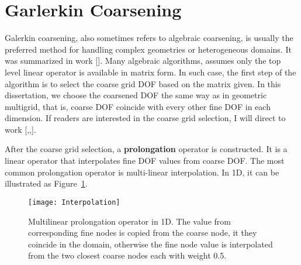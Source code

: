 \section{Garlerkin Coarsening}
Galerkin coarsening, also sometimes refers to algebraic coarsening, is usually the preferred method for handling complex geometries or heterogeneous domains. It was summarized in work [\cite{brandt1986algebraic}]. Many algebraic algorithms, assumes only the top level linear operator is available in matrix form. In such case, the first step of the algorithm is to select the coarse grid DOF based on the matrix given. In this dissertation, we choose the coarsened DOF the same way as in geometric multigrid, that is, coarse DOF coincide with every other fine DOF in each dimension. If readers are interested in the coarse grid selection, I will direct to work [\cite{vanvek1996algebraic},\cite{brandt1986algebraic},\cite{griebel2003algebraic}].

After the coarse grid selection, a \textbf{prolongation} operator is constructed. It is a linear operator that interpolates fine DOF values from coarse DOF. The most common prolongation operator is multi-linear interpolation. In 1D, it can be illustrated as Figure~\ref{fig:MultilinearInterpolation}.
\begin{figure}[t]
\centering
\texttt{[image: Interpolation]}
  \caption{Multilinear prolongation operator in 1D. The value from corresponding fine nodes is copied from the coarse node, it they coincide in the domain, otherwise the fine node value is interpolated from the two closest coarse nodes each with weight 0.5.}
  \label{fig:MultilinearInterpolation}
\end{figure}


